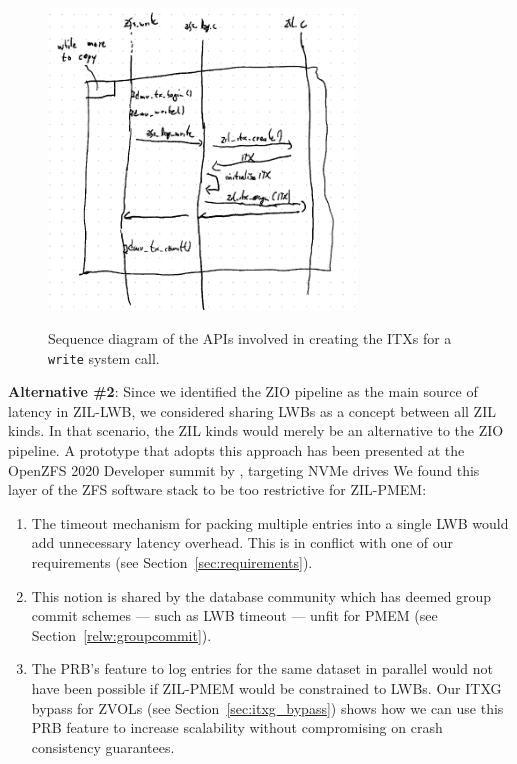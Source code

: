 \documentclass[12pt,a4paper,twoside]{book}
\begin{document}
\begin{figure}
    \includegraphics[height=8cm]{fig/zfs_log_write_sequence_diagram}
    \label{fig:zfs_log_write_sequence_diagram}
    \caption{Sequence diagram of the APIs involved in creating the ITXs for a \lstinline{write} system call.}
\end{figure}

\textbf{Alternative \#2}: Since we identified the ZIO pipeline as the main source of latency in ZIL-LWB, we considered sharing LWBs as a concept between all ZIL kinds.
In that scenario, the ZIL kinds would merely be an alternative to the ZIO pipeline.
A prototype that adopts this approach has been presented at the OpenZFS 2020 Developer summit by \citeauthor{openzfsZILPerformanceImprovements2020}, targeting NVMe drives \cite{openzfsZILPerformanceImprovements2020}
We found this layer of the ZFS software stack to be too restrictive for ZIL-PMEM:
\begin{enumerate}
    \item The timeout mechanism for packing multiple entries into a single LWB would add unnecessary latency overhead.
        This is in conflict with one of our requirements (see Section~\ref{sec:requirements}).
    \item This notion is shared by the database community which has deemed group commit schemes --- such as LWB timeout --- unfit for PMEM (see Section~\ref{relw:groupcommit}).
    \item The PRB's feature to log entries for the same dataset in parallel would not have been possible if ZIL-PMEM would be constrained to LWBs.
        Our ITXG bypass for ZVOLs (see Section~\ref{sec:itxg_bypass}) shows how we can use this PRB feature to increase scalability without compromising on crash consistency guarantees.
\end{enumerate}
\end{document}
